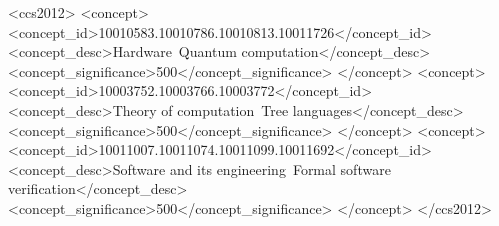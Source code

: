 
\begin{CCSXML}
<ccs2012>
   <concept>
       <concept_id>10010583.10010786.10010813.10011726</concept_id>
       <concept_desc>Hardware~Quantum computation</concept_desc>
       <concept_significance>500</concept_significance>
       </concept>
   <concept>
       <concept_id>10003752.10003766.10003772</concept_id>
       <concept_desc>Theory of computation~Tree languages</concept_desc>
       <concept_significance>500</concept_significance>
       </concept>
   <concept>
       <concept_id>10011007.10011074.10011099.10011692</concept_id>
       <concept_desc>Software and its engineering~Formal software verification</concept_desc>
       <concept_significance>500</concept_significance>
       </concept>
 </ccs2012>
\end{CCSXML}











